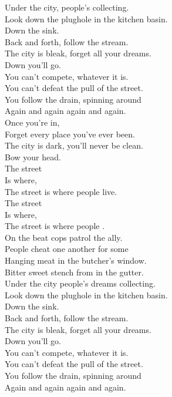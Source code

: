 Under the city, people's  collecting. \\
Look down the plughole in the kitchen basin. \\

Down the sink. \\
Back and forth, follow the stream. \\
The city is bleak, forget all your dreams. \\
Down you'll go. \\

You can't compete, whatever it is. \\
You can't defeat the pull of the street. \\
You follow the drain, spinning around \\
Again and again again and again. \\

Once you're in, \\
Forget every place you've ever been. \\
The city is dark, you'll never be clean. \\
Bow your head. \\

The street \\
Is where, \\
The street is where people live. \\
The street \\
Is where, \\
The street is where people . \\

On the beat cops patrol the ally. \\
People cheat one another for some \\
Hanging meat in the butcher's window. \\
Bitter sweet stench from in the gutter. \\

Under the city people's dreams collecting. \\
Look down the plughole in the kitchen basin. \\

Down the sink. \\
Back and forth, follow the stream. \\
The city is bleak, forget all your dreams. \\
Down you'll go. \\

You can't compete, whatever it is. \\
You can't defeat the pull of the street. \\
You follow the drain, spinning around \\
Again and again again and again. \\

